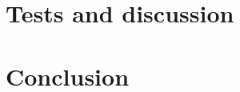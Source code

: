 \documentclass[twocolumn]{article}
\begin{document}
\section{Tests and discussion}




\section{Conclusion}



{}
\vfill
\end{document}
